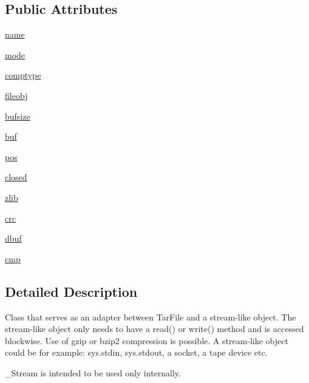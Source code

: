 \subsection*{Public Attributes}
\begin{DoxyCompactItemize}
\item 
\hyperlink{classpip_1_1__vendor_1_1distlib_1_1__backport_1_1tarfile_1_1__Stream_a18575350de61928a7f7a267b81c9cce9}{name}
\item 
\hyperlink{classpip_1_1__vendor_1_1distlib_1_1__backport_1_1tarfile_1_1__Stream_a801112e1cc33547b52200ac627e0b4b8}{mode}
\item 
\hyperlink{classpip_1_1__vendor_1_1distlib_1_1__backport_1_1tarfile_1_1__Stream_ad4cb03b7c25f50b7ec029150bd9c59b4}{comptype}
\item 
\hyperlink{classpip_1_1__vendor_1_1distlib_1_1__backport_1_1tarfile_1_1__Stream_a27df5d122e6c38b5bfb33a7d1a4a814e}{fileobj}
\item 
\hyperlink{classpip_1_1__vendor_1_1distlib_1_1__backport_1_1tarfile_1_1__Stream_a9c0a6c7a231cbac3394f9e443eca1b34}{bufsize}
\item 
\hyperlink{classpip_1_1__vendor_1_1distlib_1_1__backport_1_1tarfile_1_1__Stream_ad2760a102f4a0ca7f42bd08173ed5d14}{buf}
\item 
\hyperlink{classpip_1_1__vendor_1_1distlib_1_1__backport_1_1tarfile_1_1__Stream_a7abc9d0e37a25b571c5b2bc3a2e42658}{pos}
\item 
\hyperlink{classpip_1_1__vendor_1_1distlib_1_1__backport_1_1tarfile_1_1__Stream_a85421f6e4a51bc983844a9bbae9879ab}{closed}
\item 
\hyperlink{classpip_1_1__vendor_1_1distlib_1_1__backport_1_1tarfile_1_1__Stream_a0baf54b6464cdc9be13b38345ec77f3a}{zlib}
\item 
\hyperlink{classpip_1_1__vendor_1_1distlib_1_1__backport_1_1tarfile_1_1__Stream_aeb97450dda942ecc292f5d6af5f81283}{crc}
\item 
\hyperlink{classpip_1_1__vendor_1_1distlib_1_1__backport_1_1tarfile_1_1__Stream_a022fc4e452ca9290dd68c8cb83cda6ca}{dbuf}
\item 
\hyperlink{classpip_1_1__vendor_1_1distlib_1_1__backport_1_1tarfile_1_1__Stream_a06d72a86bfc3c940573ba323d7d68f99}{cmp}
\end{DoxyCompactItemize}


\subsection{Detailed Description}
\begin{DoxyVerb}Class that serves as an adapter between TarFile and
   a stream-like object.  The stream-like object only
   needs to have a read() or write() method and is accessed
   blockwise.  Use of gzip or bzip2 compression is possible.
   A stream-like object could be for example: sys.stdin,
   sys.stdout, a socket, a tape device etc.

   _Stream is intended to be used only internally.
\end{DoxyVerb}
 

